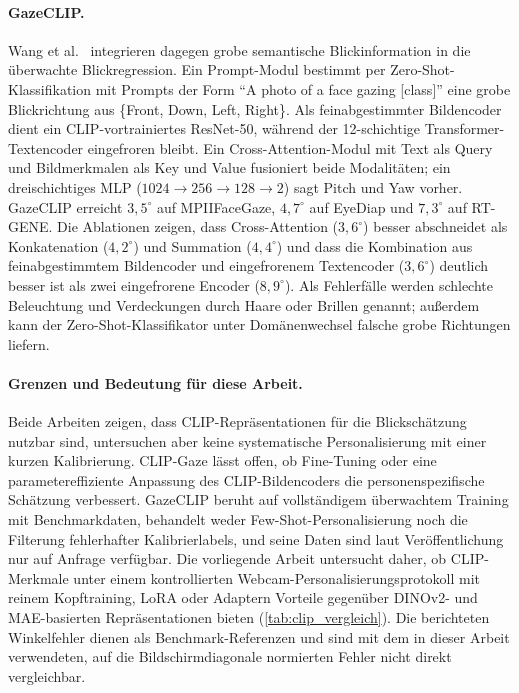 \documentclass[
  11pt,
  a4paper,
  oneside,
  DIV=12,                 %
  BCOR=8mm,               %
  parskip=half,           %
  headings=normal,
  bibliography=totoc,     %
  listof=totoc            %
]{scrreprt}
\begin{document}
\paragraph{GazeCLIP.}
Wang et al.~\cite{wang2026gazeclip} integrieren dagegen grobe semantische Blickinformation in die überwachte Blickregression. Ein Prompt-Modul bestimmt per Zero-Shot-Klassifikation mit Prompts der Form \enquote{A photo of a face gazing [class]} eine grobe Blickrichtung aus \{Front, Down, Left, Right\}. Als feinabgestimmter Bildencoder dient ein CLIP-vortrainiertes ResNet-50, während der 12-schichtige Transformer-Textencoder eingefroren bleibt. Ein Cross-Attention-Modul mit Text als Query und Bildmerkmalen als Key und Value fusioniert beide Modalitäten; ein dreischichtiges MLP ($1024 \rightarrow 256 \rightarrow 128 \rightarrow 2$) sagt Pitch und Yaw vorher. GazeCLIP erreicht $3,5^\circ$ auf MPIIFaceGaze, $4,7^\circ$ auf EyeDiap und $7,3^\circ$ auf RT-GENE. Die Ablationen zeigen, dass Cross-Attention ($3,6^\circ$) besser abschneidet als Konkatenation ($4,2^\circ$) und Summation ($4,4^\circ$) und dass die Kombination aus feinabgestimmtem Bildencoder und eingefrorenem Textencoder ($3,6^\circ$) deutlich besser ist als zwei eingefrorene Encoder ($8,9^\circ$). Als Fehlerfälle werden schlechte Beleuchtung und Verdeckungen durch Haare oder Brillen genannt; außerdem kann der Zero-Shot-Klassifikator unter Domänenwechsel falsche grobe Richtungen liefern.

\paragraph{Grenzen und Bedeutung für diese Arbeit.}
Beide Arbeiten zeigen, dass CLIP-Repräsentationen für die Blickschätzung nutzbar sind, untersuchen aber keine systematische Personalisierung mit einer kurzen Kalibrierung. CLIP-Gaze lässt offen, ob Fine-Tuning oder eine parametereffiziente Anpassung des CLIP-Bildencoders die personenspezifische Schätzung verbessert. GazeCLIP beruht auf vollständigem überwachtem Training mit Benchmarkdaten, behandelt weder Few-Shot-Personalisierung noch die Filterung fehlerhafter Kalibrierlabels, und seine Daten sind laut Veröffentlichung nur auf Anfrage verfügbar. Die vorliegende Arbeit untersucht daher, ob CLIP-Merkmale unter einem kontrollierten Webcam-Personalisierungsprotokoll mit reinem Kopftraining, LoRA oder Adaptern Vorteile gegenüber DINOv2- und MAE-basierten Repräsentationen bieten (\cref{tab:clip_vergleich}). Die berichteten Winkelfehler dienen als Benchmark-Referenzen und sind mit dem in dieser Arbeit verwendeten, auf die Bildschirmdiagonale normierten Fehler nicht direkt vergleichbar.
\end{document}
